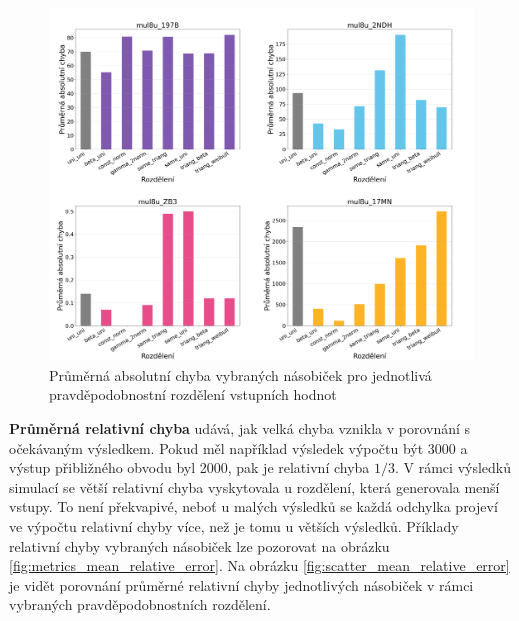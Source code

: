 \begin{figure}[H]
    \centering
    \includegraphics[width=\textwidth]{obrazky-figures/metrics_mean_abs_error.png}
    \caption{Průměrná absolutní chyba vybraných násobiček pro jednotlivá pravděpodobnostní rozdělení vstupních hodnot}
    \label{fig:metrics_mean_abs_error}
\end{figure}

\textbf{Průměrná relativní chyba} udává, jak velká chyba vznikla v porovnání s očekávaným výsledkem. Pokud měl například výsledek výpočtu být 3000 a výstup přibližného obvodu byl 2000, pak je relativní chyba $1/3$. 
V rámci výsledků simulací se větší relativní chyba vyskytovala u rozdělení, která generovala menší vstupy. To není překvapivé, neboť u malých výsledků se každá odchylka projeví ve výpočtu relativní chyby více, než je tomu u větších výsledků. Příklady relativní chyby vybraných násobiček lze pozorovat na obrázku \ref{fig:metrics_mean_relative_error}. Na obrázku \ref{fig:scatter_mean_relative_error} je vidět porovnání průměrné relativní chyby jednotlivých násobiček v rámci vybraných pravděpodobnostních rozdělení.

